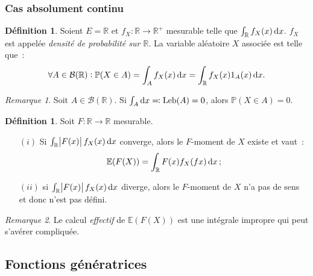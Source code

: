 \documentclass{article}
\newcommand{\E}{\mathbb E}
\renewcommand{\P}{\mathbb P}
\newcommand{\R}{\mathbb R}
\DeclareMathOperator{\Leb}{Leb}
\theoremstyle{definition}
\newtheorem{déf}[thm]{Définition}
\theoremstyle{remark}
\newtheorem*{rmq}{Remarque}
\begin{document}
		\subsubsection{Cas absolument continu}
		\begin{déf} Soient $E = \R$ et $f_X : \R \to \R^+$ mesurable telle que $\int_\R f_X(x)\dif x$. $f_X$ est appelée \emph{densité de probabilité sur $\R$}.
		La variable aléatoire $X$ associée est telle que~:
		\[\forall A \in \mathcal B(\R) : \P(X \in A) = \int_A f_X(x)\dif x = \int_\R f_X(x)1_A(x)\dif x.\]
		\end{déf}

		\begin{rmq} Soit $A \in \mathcal B(\R)$. Si $\int_A\dif x \eqqcolon \Leb(A) = 0$, alors $\P(X \in A) = 0$. \end{rmq}

		\begin{déf} Soit $F : \R \to \R$ mesurable.

		\begin{itemize}
			\item[$(i)$] Si $\int_\R \abs{F(x)}f_X(x)\dif x$ converge, alors le $F$-moment de $X$ existe et vaut~:
			             \[\E(F(X)) = \int_\R F(x)f_X(fx)\dif x\,;\]
			\item[$(ii)$] si $\int_\R \abs{F(x)}f_X(x)\dif x$ diverge, alors le $F$-moment de $X$ n'a pas de sens et donc n'est pas défini.
		\end{itemize}
		\end{déf}

		\begin{rmq} Le calcul \emph{effectif} de $\E(F(X))$ est une intégrale impropre qui peut s'avérer compliquée. \end{rmq}
	
	\subsection{Fonctions génératrices}
\end{document}
